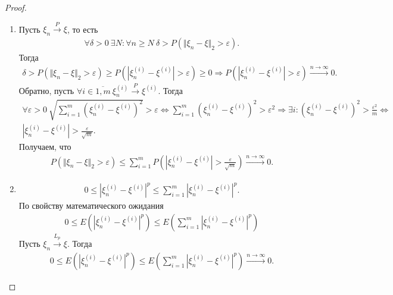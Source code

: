 \begin{proof}
\begin{enumerate}
		\item Пусть $\xi _{n}\xrightarrow{P} \xi$, то есть
		\begin{gather*}
		    \displaystyle \forall \delta  >0\ \exists N:\forall n\geqslant N\ \delta  >P(\Vert \xi _{n} -\xi \Vert _{2}  >\varepsilon ).
		\end{gather*}
		Тогда
		\begin{gather*}
		    \delta  >P(\Vert \xi _{n} -\xi \Vert _{2}  >\varepsilon ) \geqslant P\left(\left| \xi _{n}^{( i)} -\xi ^{( i)}\right|  >\varepsilon \right) \geqslant 0\Rightarrow P\left(\left| \xi _{n}^{( i)} -\xi ^{( i)}\right|  >\varepsilon \right)\xrightarrow{n\rightarrow \infty } 0.
		\end{gather*}
		Обратно, пусть $\forall i\in \overline{1,m} \ \xi _{n}^{( i)}\xrightarrow{P} \xi ^{( i)}$. Тогда
		\begin{gather*}
		    \forall \varepsilon  >0\ \sqrt{\sum _{i=1}^{m}\left( \xi _{n}^{( i)} -\xi ^{( i)}\right)^{2}}  >\varepsilon \Leftrightarrow \sum _{i=1}^{m}\left( \xi _{n}^{( i)} -\xi ^{( i)}\right)^{2}  >\varepsilon ^{2} \Rightarrow \exists i:\left( \xi _{n}^{( i)} -\xi ^{( i)}\right)^{2}  >\frac{\varepsilon ^{2}}{m} \Leftrightarrow\\ \left| \xi _{n}^{( i)} -\xi ^{( i)}\right|  >\frac{\varepsilon }{\sqrt{m}}.
		\end{gather*}
		Получаем, что
		\begin{gather*}
		    P\left(\Vert \xi_n - \xi \Vert_2 > \varepsilon\right) \le \sum_{i=1}^m P\left(\left|\xi_n^{(i)} - \xi^{(i)}\right| > \frac{\varepsilon}{\sqrt{m}}\right) \xrightarrow{n\rightarrow\infty} 0.
		\end{gather*}
		\item
		\begin{gather*}
		    0\leqslant \left| \xi _{n}^{( i)} -\xi ^{( i)}\right| ^{p} \leqslant \sum _{i=1}^{m}\left| \xi _{n}^{( i)} -\xi ^{( i)}\right| ^{p}.
		\end{gather*}
		По свойству математического ожидания
		\begin{gather*}
		    0\leqslant E\left(\left| \xi _{n}^{( i)} -\xi ^{( i)}\right| ^{p}\right) \leqslant E\left(\sum _{i=1}^{m}\left| \xi _{n}^{( i)} -\xi ^{( i)}\right| ^{p}\right)
		\end{gather*}
		Пусть $\xi _{n}\xrightarrow{L_{p}} \xi$. Тогда
		\begin{gather*}
		    0 \le E\left(\left|\xi_n^{(i)} - \xi^{(i)}\right|^p\right) \le E\left(\sum _{i=1}^{m}\left| \xi _{n}^{( i)} -\xi ^{( i)}\right| ^{p}\right) \xrightarrow{n\rightarrow\infty} 0.

\end{gather*}
\end{enumerate}
\end{proof}

